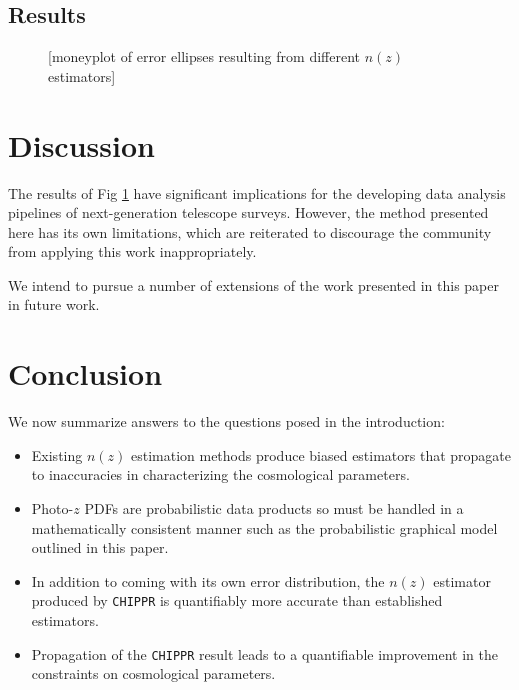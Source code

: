 \documentclass[iop]{emulateapj}
\newcommand{\chippr}{\texttt{CHIPPR} }
\begin{document}
\subsection{Results}
\label{sec:results}

\begin{figure}
	\begin{center}
		\caption{[moneyplot of error ellipses resulting from different 
$n(z)$ estimators]}
		\label{fig:money}
	\end{center}
\end{figure}

\section{Discussion}
\label{sec:discussion}

The results of Fig \ref{fig:money} have significant implications for the 
developing data analysis pipelines of next-generation telescope surveys.  
However, the method presented here has its own limitations, which are 
reiterated to discourage the community from applying this work inappropriately.

We intend to pursue a number of extensions of the work presented in this paper 
in future work.

\section{Conclusion}
\label{sec:conclusion}

We now summarize answers to the questions posed in the introduction:

\begin{itemize}
	\item Existing $n(z)$ estimation methods produce biased estimators that 
propagate to inaccuracies in characterizing the cosmological parameters.
	\item Photo-$z$ PDFs are probabilistic data products so must be handled 
in a mathematically consistent manner such as the probabilistic graphical model 
outlined in this paper.
	\item In addition to coming with its own error distribution, the $n(z)$ 
estimator produced by \chippr is quantifiably more accurate than established 
estimators.
	\item Propagation of the \chippr result leads to a quantifiable 
improvement in the constraints on cosmological parameters.
\end{itemize}
\end{document}
